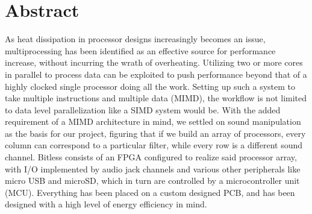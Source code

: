 
\section*{Abstract}
As heat dissipation in processor designs increasingly becomes an issue,
multiprocessing has been identified as an effective source for performance
increase, without incurring the wrath of overheating. Utilizing two or more
cores in parallel to process data can be exploited to push performance beyond
that of a highly clocked single processor doing all the work.
Setting up such
a system to take multiple instructions and multiple data (MIMD), the workflow
is not limited to data level parallelization like a SIMD system would be. With the added requirement of a MIMD architecture in mind, we settled on sound manipulation as the basis for our project,
figuring that if we build an array of processors, every column can correspond
to a particular filter, while every row is a different sound channel.
\newline
Bitless consists of an FPGA configured to realize said processor array, with
I/O implemented by audio jack channels and various other peripherals like micro
USB and microSD, which in turn are controlled by a microcontroller unit (MCU).
Everything has been placed on a custom designed PCB, and has been designed with
a high level of energy efficiency in mind.
\newline
{}
